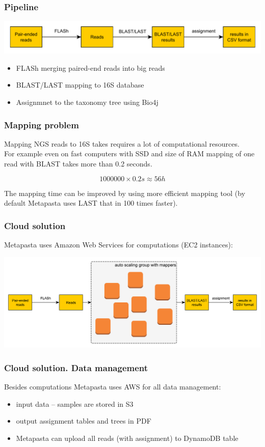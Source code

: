 \documentclass{beamer}
\begin{document}
\begin{frame}
\frametitle{Pipeline}
\includegraphics[width=\textwidth]{general.pdf}

\begin{itemize}
  \item FLASh merging paired-end reads into big reads
  \item BLAST/LAST mapping to 16S database
  \item Assignmnet to the taxonomy tree using Bio4j
\end{itemize}

\end{frame}

\begin{frame}
\frametitle{Mapping problem}
Mapping NGS reads to 16S takes requires a lot of computational resources.
\\
For example even on fast computers with SSD and size of RAM mapping of one read with BLAST takes more than 0.2 seconds.

$$ 1 000 000 \times 0.2 s \approx 56 h $$

The mapping time can be improved by using more efficient mapping tool (by default Metapasta uses LAST that in 100 times faster).
\end{frame}

\begin{frame}
\frametitle{Cloud solution}

Metapasta uses Amazon Web Services for computations (EC2 instances):

\includegraphics[width=\textwidth]{pipeline_dist.pdf}
\end{frame}



\begin{frame}
\frametitle{Cloud solution. Data management}
Besides computations Metapasta uses AWS for all data management:
\begin{itemize}
  \item input data -- samples are stored in S3
  \item output assignment tables and trees in PDF
  \item Metapasta can upload all reads (with assignment) to DynamoDB table 
\end{itemize}
\end{frame}
\end{document}
